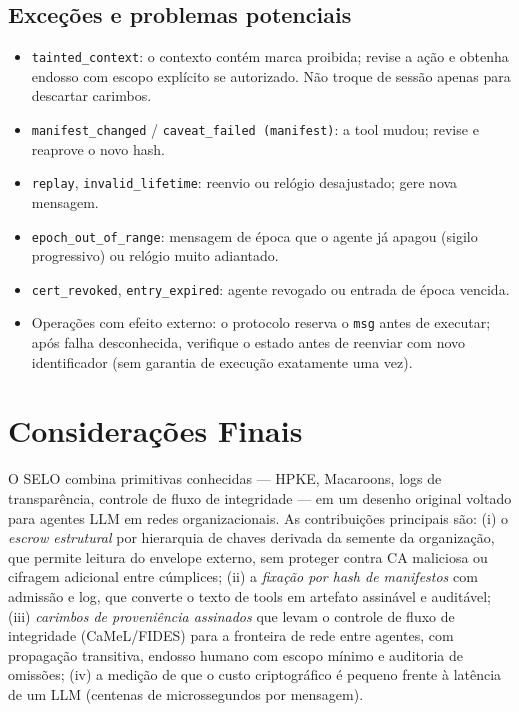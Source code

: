 \documentclass[11pt,a4paper]{article}
\theoremstyle{plain}
\theoremstyle{definition}
\theoremstyle{remark}
\newcommand{\cod}[1]{\texttt{#1}}
\begin{document}
\subsection*{Exceções e problemas potenciais}
\begin{itemize}
  \item \cod{tainted\_context}: o contexto contém marca proibida; revise a ação e obtenha endosso com escopo explícito se autorizado. Não troque de sessão apenas para descartar carimbos.
  \item \cod{manifest\_changed} / \cod{caveat\_failed (manifest)}: a tool mudou; revise e reaprove o novo hash.
  \item \cod{replay}, \cod{invalid\_lifetime}: reenvio ou relógio desajustado; gere nova mensagem.
  \item \cod{epoch\_out\_of\_range}: mensagem de época que o agente já apagou (sigilo progressivo) ou relógio muito adiantado.
  \item \cod{cert\_revoked}, \cod{entry\_expired}: agente revogado ou entrada de época vencida.
  \item Operações com efeito externo: o protocolo reserva o \cod{msg} antes de executar; após falha desconhecida, verifique o estado antes de reenviar com novo identificador (sem garantia de execução exatamente uma vez).
\end{itemize}

\section{Considerações Finais}

O SELO combina primitivas conhecidas --- HPKE, Macaroons, logs de transparência, controle de fluxo de integridade --- em um desenho original voltado para agentes LLM em redes organizacionais. As contribuições principais são: (i) o \emph{escrow estrutural} por hierarquia de chaves derivada da semente da organização, que permite leitura do envelope externo, sem proteger contra CA maliciosa ou cifragem adicional entre cúmplices; (ii) a \emph{fixação por hash de manifestos} com admissão e log, que converte o texto de tools em artefato assinável e auditável; (iii) \emph{carimbos de proveniência assinados} que levam o controle de fluxo de integridade (CaMeL/FIDES) para a fronteira de rede entre agentes, com propagação transitiva, endosso humano com escopo mínimo e auditoria de omissões; (iv) a medição de que o custo criptográfico é pequeno frente à latência de um LLM (centenas de microssegundos por mensagem).
\end{document}
